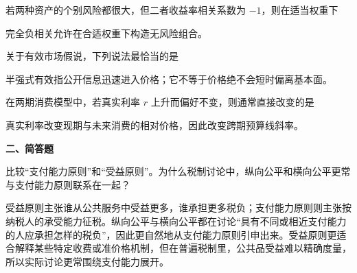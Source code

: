 \begin{question}
若两种资产的个别风险都很大，但二者收益率相关系数为 $-1$，则在适当权重下
\begin{choiceoptions}[2]
\end{choiceoptions}
\begin{solution}
完全负相关允许在合适权重下构造无风险组合。
\end{solution}
\end{question}

\begin{question}
关于有效市场假说，下列说法最恰当的是
\begin{choiceoptions}[1]
\end{choiceoptions}
\begin{solution}
半强式有效指公开信息迅速进入价格；它不等于价格绝不会短时偏离基本面。
\end{solution}
\end{question}

\begin{question}
在两期消费模型中，若真实利率 $r$ 上升而偏好不变，则通常直接改变的是
\begin{choiceoptions}[2]
\end{choiceoptions}
\begin{solution}
真实利率改变现期与未来消费的相对价格，因此改变跨期预算线斜率。
\end{solution}
\end{question}

\textbf{二、简答题}

\begin{question}
比较“支付能力原则”和“受益原则”。为什么税制讨论中，纵向公平和横向公平更常与支付能力原则联系在一起？
\begin{solution}
受益原则主张谁从公共服务中受益更多，谁承担更多税负；支付能力原则则主张按纳税人的承受能力征税。纵向公平与横向公平都在讨论“具有不同或相近支付能力的人应承担怎样的税负”，因此更自然地从支付能力原则引申出来。受益原则更适合解释某些特定收费或准价格机制，但在普遍税制里，公共品受益难以精确度量，所以实际讨论更常围绕支付能力展开。\end{solution}
\end{question}

